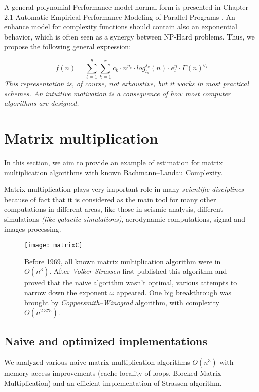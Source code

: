 A general polynomial Performance model normal form is presented in Chapter 2.1 Automatic Empirical Performance Modeling of Parallel Programs \cite{calotoiu2018automatic}. An enhance model for complexity functions should contain also an exponential behavior, which is often seen as a synergy between NP-Hard problems. Thus, we propose the following general expression:

\[ f(n) =\sum\limits_{t=1}^{y}  \sum\limits_{k=1}^{x} c_{k} \cdot n^{p_{k}} \cdot log_{l_{k}}^{j_{k}}(n) \cdot e_{t}^{n} \cdot  \Gamma(n)^{g_{k}} \]
\textit{This representation is, of course, not exhaustive, but it works in most practical schemes. An intuitive motivation is a consequence of how most computer algorithms are designed. \cite{calotoiu2018automatic}}


\section{Matrix multiplication}
In this section, we aim to provide an example of estimation for matrix multiplication algorithms with known Bachmann–Landau Complexity.

Matrix multiplication plays very important role in many \textit{scientific disciplines} because of fact that it is considered as the main tool for many other computations in different areas, like those in seismic analysis, different simulations \textit{(like galactic simulations)}, aerodynamic computations, signal and images processing. \cite{4588528}


\begin{figure}[H]
    \centering
    \texttt{[image: matrixC]}
    \caption{Before 1969, all known matrix multiplication algorithm were in $O(n^3)$. After \textit{Volker Strassen} first published this algorithm and proved that the naive algorithm wasn't optimal, various attempts to narrow down the exponent $\omega$ appeared. One big breakthrough was brought by \textit{Coppersmith–Winograd} algorithm, with complexity $O(n^{2.375})$. }
\end{figure}

\subsection{Naive and optimized implementations}
We analyzed various naive matrix multiplication algorithms $O(n^3)$ with memory-access improvements (cache-locality of loops, Blocked Matrix Multiplication) and an efficient implementation of Strassen algorithm.

